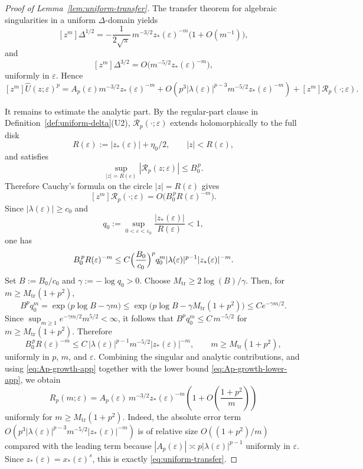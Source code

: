 \documentclass[11pt]{amsart}
\numberwithin{equation}{section}
\theoremstyle{plain}
\theoremstyle{definition}
\theoremstyle{remark}
\begin{document}
\begin{proof}[Proof of Lemma~\ref{lem:uniform-transfer}]
The transfer theorem for algebraic singularities in a uniform \(\Delta\)-domain
yields
\[
[z^m]\Delta^{1/2}
=
-\frac{1}{2\sqrt{\pi}}\,m^{-3/2}z_*(\varepsilon)^{-m}
\bigl(1+O(m^{-1})\bigr),
\]
and
\[
[z^m]\Delta^{3/2}
=
O\bigl(m^{-5/2}z_*(\varepsilon)^{-m}\bigr),
\]
uniformly in \(\varepsilon\). Hence
\[
[z^m]\widehat U(z;\varepsilon)^p
=
A_p(\varepsilon)m^{-3/2}z_*(\varepsilon)^{-m}
+
O\left(
p^3|\lambda(\varepsilon)|^{p-3}m^{-5/2}z_*(\varepsilon)^{-m}
\right)
+
[z^m]\mathcal R_p(\cdot;\varepsilon).
\]

It remains to estimate the analytic part. By the regular-part clause in
Definition~\ref{def:uniform-delta}\textup{(U2)}, \(\mathcal R_p(\cdot;\varepsilon)\) extends
holomorphically to the full disk
\[
R(\varepsilon):=|z_*(\varepsilon)|+\eta_0/2,
\qquad |z|<R(\varepsilon),
\]
and satisfies
\[
\sup_{|z|=R(\varepsilon)}|\mathcal R_p(z;\varepsilon)|\le B_0^{\,p}.
\]
Therefore Cauchy's formula on the circle \(|z|=R(\varepsilon)\) gives
\[
[z^m]\mathcal R_p(\cdot;\varepsilon)
=
O\bigl(B_0^{\,p}R(\varepsilon)^{-m}\bigr).
\]
Since \(|\lambda(\varepsilon)|\ge c_0\) and
\[
q_0:=\sup_{0<\varepsilon<\varepsilon_0}\frac{|z_*(\varepsilon)|}{R(\varepsilon)}<1,
\]
one has
\[
B_0^{\,p}R(\varepsilon)^{-m}
\le
C\Bigl(\frac{B_0}{c_0}\Bigr)^p q_0^m
|\lambda(\varepsilon)|^{p-1}|z_*(\varepsilon)|^{-m}.
\]
Set \(B:=B_0/c_0\) and \(\gamma:=-\log q_0>0\). Choose
\(M_{\mathrm{tr}}\ge 2\log(B)/\gamma\). Then, for
\(m\ge M_{\mathrm{tr}}(1+p^2)\),
\[
B^p q_0^m
=
\exp\bigl(p\log B-\gamma m\bigr)
\le
\exp\bigl(p\log B-\gamma M_{\mathrm{tr}}(1+p^2)\bigr)
\le
C e^{-\gamma m/2}.
\]
Since \(\sup_{m\ge1} e^{-\gamma m/2}m^{5/2}<\infty\), it follows that $B^p q_0^m\le C\,m^{-5/2}$ for $m\ge M_{\mathrm{tr}}(1+p^2)$. Therefore
\[
B_0^{\,p}R(\varepsilon)^{-m}
\le
C\,|\lambda(\varepsilon)|^{p-1}m^{-5/2}|z_*(\varepsilon)|^{-m},
\qquad
m\ge M_{\mathrm{tr}}(1+p^2),
\]
uniformly in \(p\), \(m\), and \(\varepsilon\). Combining the singular and analytic contributions, and using
\eqref{eq:Ap-growth-app} together with the lower bound \eqref{eq:Ap-growth-lower-app}, we obtain
\[
R_p(m;\varepsilon)
=
A_p(\varepsilon)\,m^{-3/2}z_*(\varepsilon)^{-m}
\left(
1+O\!\left(\frac{1+p^2}{m}\right)
\right)
\]
uniformly for \(m\ge M_{\mathrm{tr}}(1+p^2)\). Indeed, the absolute error term
\(O\!\left(p^3|\lambda(\varepsilon)|^{p-3}m^{-5/2}|z_*(\varepsilon)|^{-m}\right)\)
is of relative size \(O((1+p^2)/m)\) compared with the leading term because
\(|A_p(\varepsilon)|\asymp p|\lambda(\varepsilon)|^{p-1}\) uniformly in
\(\varepsilon\). Since \(z_*(\varepsilon)=x_*(\varepsilon)^s\), this is exactly
\eqref{eq:uniform-transfer}.
\end{proof}
\end{document}
